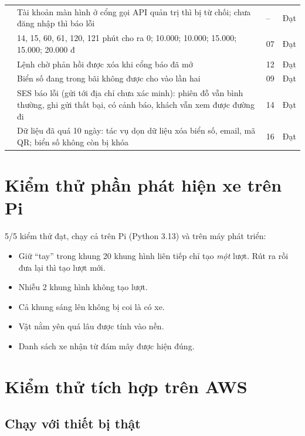 \begin{longtable}{@{}P{5.2cm}P{6.6cm}P{1.6cm}P{0.8cm}@{}}
 & Tài khoản màn hình ở cổng gọi API quản trị thì bị từ chối; chưa đăng nhập thì báo lỗi & -- & Đạt \\
 & 14, 15, 60, 61, 120, 121 phút cho ra 0; 10.000; 10.000; 15.000; 15.000; 20.000 đ & 07 & Đạt \\
 & Lệnh chờ phản hồi được xóa khi cổng báo đã mở & 12 & Đạt \\
 & Biển số đang trong bãi không được cho vào lần hai & 09 & Đạt \\
 & SES báo lỗi (gửi tới địa chỉ chưa xác minh): phiên đỗ vẫn bình thường, ghi gửi thất bại, có cảnh báo, khách vẫn xem được đường đi & 14 & Đạt \\
 & Dữ liệu đã quá 10 ngày: tác vụ dọn dữ liệu xóa biển số, email, mã QR; biển số không còn bị khóa & 16 & Đạt \\
\bottomrule
\end{longtable}

\section{Kiểm thử phần phát hiện xe trên Pi}

5/5 kiểm thử đạt, chạy cả trên Pi (Python 3.13) và trên máy phát triển:
\begin{itemize}
  \item Giữ ``tay'' trong khung 20 khung hình liên tiếp chỉ tạo \emph{một} lượt. Rút ra rồi đưa lại thì tạo lượt mới.
  \item Nhiễu 2 khung hình không tạo lượt.
  \item Cả khung sáng lên không bị coi là có xe.
  \item Vật nằm yên quá lâu được tính vào nền.
  \item Danh sách xe nhận từ đám mây được hiện đúng.
\end{itemize}

\section{Kiểm thử tích hợp trên AWS}

\subsection{Chạy với thiết bị thật}\label{sec:vong2}

